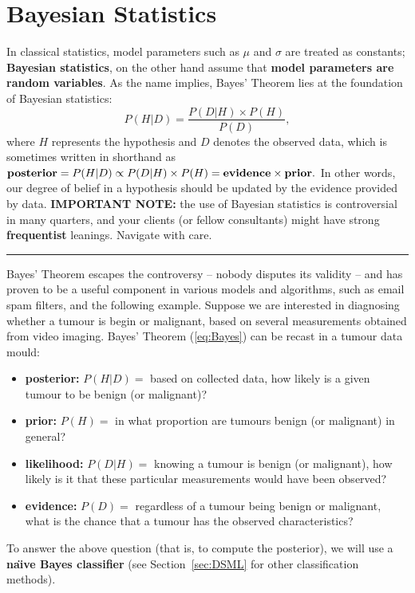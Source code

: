 \section{Bayesian Statistics}
In classical statistics, model parameters such as $\mu$ and $\sigma$ are treated as constants; \textbf{Bayesian statistics}, on the other hand assume that \textbf{model parameters are random variables}. As the name implies, Bayes' Theorem lies at the foundation of Bayesian statistics: 
\begin{equation}\label{eq:Bayes}
    P(H|D)=\frac{P(D|H)\times P(H)}{P(D)},
\end{equation}
where $H$ represents the hypothesis and $D$ denotes the observed data, which is sometimes written in shorthand as  $\textrm{\textbf{posterior}} = P(H|D) \propto P(D|H)\times P(H) = \textrm{\textbf{evidence}} \times \textrm{\textbf{prior}}.$ In other words, our degree of belief in a hypothesis should be updated by the evidence provided by data. \newpage\noindent \textbf{IMPORTANT NOTE:} the use of Bayesian statistics is controversial in many quarters, and your clients (or fellow consultants) might have strong \textbf{frequentist} leanings. Navigate with care. \begin{center}
    \rule{0.5\textwidth}{.4pt}
\end{center}
Bayes' Theorem escapes the controversy -- nobody disputes its validity -- and has proven to be a useful component in various models and algorithms, such as email spam filters, and the following example. \newl 
Suppose we are interested in diagnosing whether a tumour is begin or malignant, based on several measurements obtained from video imaging. Bayes' Theorem (\ref{eq:Bayes}) can be recast in a tumour data mould:
\begin{itemize}[noitemsep]
    \item \textbf{posterior:} $P(H|D)=$ based on collected data, how likely is a given tumour to be benign (or malignant)?
    \item \textbf{prior:} $P(H)=$ in what proportion are tumours benign (or malignant) in general? 
    \item \textbf{likelihood:} $P(D|H)=$ knowing a tumour is benign (or malignant), how likely is it that these particular measurements would have been observed?
    \item \textbf{evidence:} $P(D)=$ regardless of a tumour being benign or malignant, what is the chance that a tumour has the observed characteristics?
\end{itemize}
To answer the above question (that is, to compute the posterior), we will use a \textbf{na\"{\i}ve Bayes classifier} (see Section~\ref{sec:DSML} for other classification methods).
